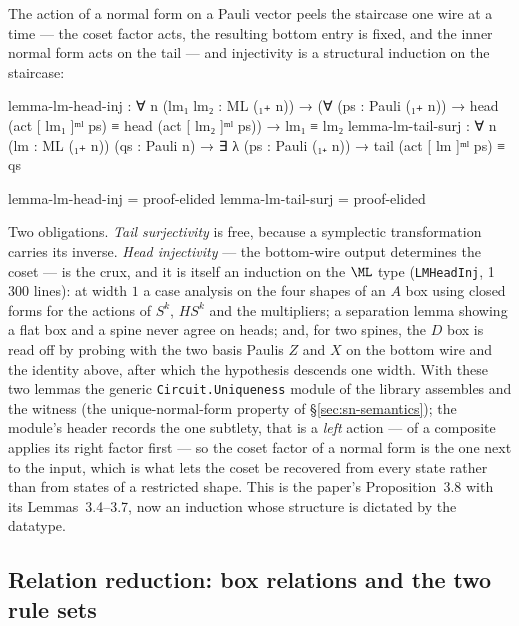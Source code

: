 \noindent The action of a normal form on a Pauli vector peels the
staircase one wire at a time --- the coset factor acts, the resulting
bottom entry is fixed, and the inner normal form acts on the tail ---
and injectivity is a structural induction on the staircase:

\begingroup\renewcommand{\AgdaCodeStyle}{\footnotesize}
\begin{code}
lemma-lm-head-inj : ∀ {n} (lm₁ lm₂ : ML (₁₊ n)) →
  (∀ (ps : Pauli (₁₊ n)) → head (act [ lm₁ ]ᵐˡ ps) ≡ head (act [ lm₂ ]ᵐˡ ps)) → lm₁ ≡ lm₂
lemma-lm-tail-surj : ∀ {n} (lm : ML (₁₊ n)) (qs : Pauli n) →
  ∃ λ (ps : Pauli (₁₊ n)) → tail (act [ lm ]ᵐˡ ps) ≡ qs
\end{code}
\endgroup
\begin{code}[hide]
lemma-lm-head-inj = proof-elided
lemma-lm-tail-surj = proof-elided
\end{code}

Two obligations.  \emph{Tail surjectivity} is free, because a
symplectic transformation carries its inverse.  \emph{Head injectivity}
--- the bottom-wire output determines the coset --- is the crux, and it
is itself an induction on the $\ML$ type (\texttt{LMHeadInj},
1\,300 lines): at width $1$ a case analysis on the four shapes of an
$A$ box using closed forms for the actions of $S^{k}$, $HS^{k}$ and the
multipliers; a separation lemma showing a flat box and a spine never
agree on heads; and, for two spines, the $D$ box is read off by probing
with the two basis Paulis $Z$ and $X$ on the bottom wire and the identity
above, after which the hypothesis descends one width.  With these two
lemmas the generic \texttt{Circuit.Uniqueness} module of the library
assembles  and the  witness
(the unique-normal-form property of \S\ref{sec:sn-semantics});
the module's header records the one subtlety, that  is a
\emph{left} action ---  of a composite applies its right factor
first --- so the coset factor of a normal form is the one next to the
input, which is what lets the coset be recovered from every state rather
than from states of a restricted shape.  This is the paper's
Proposition~3.8 with its Lemmas~3.4--3.7, now an induction whose
structure is dictated by the datatype.

\subsection{Relation reduction: box relations and the two rule sets}\label{sec:reduction}

